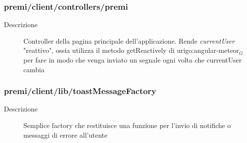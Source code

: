 \subsubsection{premi/client/controllers/premi}

\begin{description}
\item[Descrizione] \hfill
	Controller della pagina principale dell'applicazione. Rende \textit{currentUser} "reattivo", ossia utilizza il metodo getReactively di urigo:angular-meteor$_G$ per fare in modo che venga inviato un segnale ogni volta che currentUser cambia
\end{description}

\subsubsection{premi/client/lib/toastMessageFactory}

\begin{description}
\item[Descrizione] \hfill
	Semplice factory che restituisce una funzione per l'invio di notifiche o messaggi di errore all'utente
\end{description}

